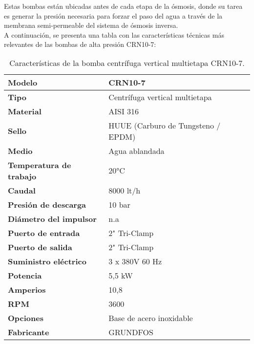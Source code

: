 Estas bombas están ubicadas antes de cada etapa de la ósmosis, donde su tarea es generar la presión necesaria para forzar el paso del agua a través de la membrana semi-permeable del sistema de ósmosis inversa.\\

A continuación, se presenta una tabla con las características técnicas más relevantes de las bombas de alta presión CRN10-7:\\



\begin{table}[H]
    \centering
    \caption{Características de la bomba centrífuga vertical multietapa CRN10-7.}
    \label{table:bomba_centrifuga}
    \begin{tabular}{| L{6cm} | L{6cm} |}
        \hline
        \textbf{Modelo} & CRN10-7  \\
        \hline
        \textbf{Tipo} & Centrífuga vertical multietapa  \\
        \hline
        \textbf{Material} & AISI 316  \\
        \hline
        \textbf{Sello} & HUUE (Carburo de Tungsteno / EPDM)  \\
        \hline
        \textbf{Medio} & Agua ablandada  \\
        \hline
        \textbf{Temperatura de trabajo} & 20°C  \\
        \hline
        \textbf{Caudal} & 8000 lt/h  \\
        \hline
        \textbf{Presión de descarga} & 10 bar  \\
        \hline
        \textbf{Diámetro del impulsor} & n.a  \\
        \hline
        \textbf{Puerto de entrada} & 2" Tri-Clamp  \\
        \hline
        \textbf{Puerto de salida} & 2" Tri-Clamp  \\
        \hline
        \textbf{Suministro eléctrico} & 3 x 380V 60 Hz  \\
        \hline
        \textbf{Potencia} & 5,5 kW  \\
        \hline
        \textbf{Amperios} & 10,8  \\
        \hline
        \textbf{RPM} & 3600  \\
        \hline
        \textbf{Opciones} & Base de acero inoxidable  \\
        \hline
        \textbf{Fabricante} & GRUNDFOS  \\
        \hline
    \end{tabular}
\end{table}



